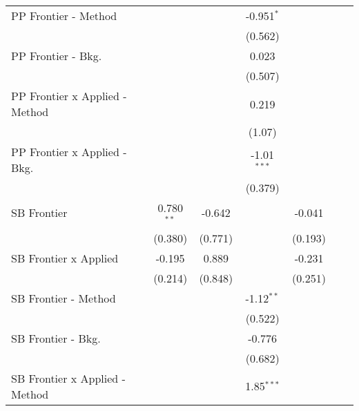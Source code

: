 \begin{tabular}{lcccccc}
   PP Frontier - Method           &                &               & -0.951$^{*}$  &               &         &   \\   
                                  &                &               & (0.562)       &               &         &   \\   
   PP Frontier - Bkg.             &                &               & 0.023         &               &         &   \\   
                                  &                &               & (0.507)       &               &         &   \\   
   PP Frontier x Applied - Method &                &               & 0.219         &               &         &   \\   
                                  &                &               & (1.07)        &               &         &   \\   
   PP Frontier x Applied - Bkg.   &                &               & -1.01$^{***}$ &               &         &   \\   
                                  &                &               & (0.379)       &               &         &   \\   
   SB Frontier                    & 0.780$^{**}$   & -0.642        &               & -0.041        &         &   \\   
                                  & (0.380)        & (0.771)       &               & (0.193)       &         &   \\   
   SB Frontier x Applied          & -0.195         & 0.889         &               & -0.231        &         &   \\   
                                  & (0.214)        & (0.848)       &               & (0.251)       &         &   \\   
   SB Frontier - Method           &                &               & -1.12$^{**}$  &               &         &   \\   
                                  &                &               & (0.522)       &               &         &   \\   
   SB Frontier - Bkg.             &                &               & -0.776        &               &         &   \\   
                                  &                &               & (0.682)       &               &         &   \\   
   SB Frontier x Applied - Method &                &               & 1.85$^{***}$  &               &         &   \\   

\end{tabular}
